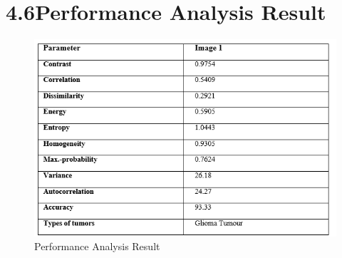 \documentclass[oneside,a4paper,12pt]{book}
\begin{document}
\section*{4.6\hspace*{10pt}Performance Analysis Result}
\begin{Center}
\begin{figure}[H]
	\begin{Center}
		\includegraphics[width=\linewidth]{performance_analysis.png}
		\caption{Performance Analysis Result}
		\label{fig:EndorsersCommitters_Role}
	\end{Center}
\end{figure}
\end{Center}\par
\end{document}
